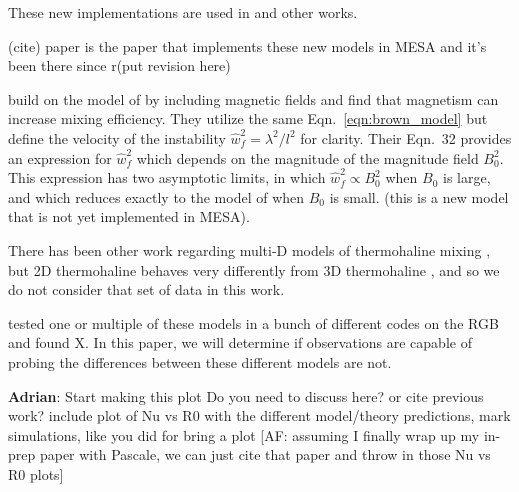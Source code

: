 These new implementations are used in \citep{bauer_bildsten_2019} and other works.

(cite) paper is the paper that implements these new models in MESA and it's been there since r(put revision here)


\citet{harrington} build on the model of \citet{brown_etal_2013} by including magnetic fields and find that magnetism can increase mixing efficiency.
They utilize the same Eqn.~\ref{eqn:brown_model} but define the velocity of the instability $\hat{w}_f^2 = \lambda^2/l^2$ for clarity. 
Their Eqn.~32 provides an expression for $\hat{w}_f^2$ which depends on the magnitude of the magnitude field $B_0^2$.
This expression has two asymptotic limits, in which $\hat{w}_f^2 \propto B_0^2$ when $B_0$ is large, and which reduces exactly to the model of \citet{brown_etal_2013} when $B_0$ is small.
(this is a new model that is not yet implemented in MESA).


There has been other work regarding multi-D models of thermohaline mixing \citep{denissenkov_2010, denissenkov_merryfield_2011}, but 2D thermohaline behaves very differently from 3D thermohaline \citep{garaud_brummell_2015}, and so we do not consider that set of data in this work.

\citet{lattanzio_etal_2015} tested one or multiple of these models in a bunch of different codes on the RGB and found X.
In this paper, we will determine if observations are capable of probing the differences between these different models are not.

\textbf{Adrian}: Start making this plot
Do you need to discuss here? or cite previous work? include plot of Nu vs R0 with the different model/theory predictions, mark simulations, like you did for bring a plot [AF: assuming I finally wrap up my in-prep paper with Pascale, we can just cite that paper and throw in those Nu vs R0 plots]
